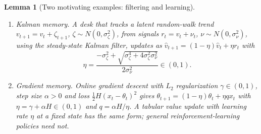 \documentclass[12pt]{article}
\newtheorem{lemma}[theorem]{Lemma}
\theoremstyle{definition}
\theoremstyle{remark}
\begin{document}
\begin{lemma}[Two motivating examples: filtering and learning]\label{lem:micro}
\begin{enumerate}[label=(\roman*)]
\item \emph{Kalman memory.} A desk that tracks a latent random-walk trend $v_{t+1}=v_t+\zeta_{t+1}$, $\zeta\sim N(0,\sigma_\zeta^2)$, from signals $r_t=v_t+\nu_t$, $\nu\sim N(0,\sigma_\nu^2)$, using the steady-state Kalman filter, updates as $\hat v_{t+1}=(1-\eta)\hat v_t+\eta r_t$ with
\begin{equation}\label{eq:kgain}
\eta=\frac{-\sigma_\zeta^2+\sqrt{\sigma_\zeta^4+4\sigma_\zeta^2\sigma_\nu^2}}{2\sigma_\nu^2}\in(0,1).
\end{equation}
\item \emph{Gradient memory.} Online gradient descent with $L_2$ regularization $\gamma\in(0,1)$, step size $\alpha>0$ and loss $\tfrac12H(x_t-\theta_t)^2$ gives $\theta_{t+1}=(1-\eta)\theta_t+\eta q x_t$ with $\eta=\gamma+\alpha H\in(0,1)$ and $q=\alpha H/\eta$. A tabular value update with learning rate $\eta$ at a fixed state has the same form; general reinforcement-learning policies need not.
\end{enumerate}
\end{lemma}
\end{document}

